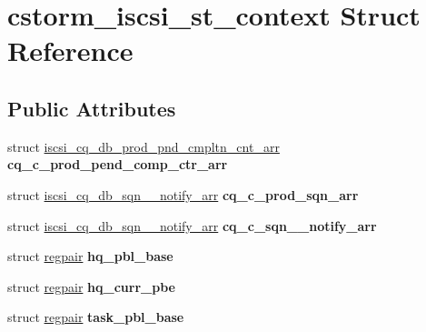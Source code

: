 \hypertarget{structcstorm__iscsi__st__context}{
\section{cstorm\_\-iscsi\_\-st\_\-context Struct Reference}
\label{structcstorm__iscsi__st__context}
}
\subsection*{Public Attributes}
\begin{DoxyCompactItemize}
\item 
\hypertarget{structcstorm__iscsi__st__context_a545823c3e85ab125d74749cd84017614}{
struct \hyperlink{structiscsi__cq__db__prod__pnd__cmpltn__cnt__arr}{iscsi\_\-cq\_\-db\_\-prod\_\-pnd\_\-cmpltn\_\-cnt\_\-arr} {\bfseries cq\_\-c\_\-prod\_\-pend\_\-comp\_\-ctr\_\-arr}}
\label{structcstorm__iscsi__st__context_a545823c3e85ab125d74749cd84017614}

\item 
\hypertarget{structcstorm__iscsi__st__context_ad0f6db90e1d44b06b060afb063b182d9}{
struct \hyperlink{structiscsi__cq__db__sqn__2__notify__arr}{iscsi\_\-cq\_\-db\_\-sqn\_\_\-notify\_\-arr} {\bfseries cq\_\-c\_\-prod\_\-sqn\_\-arr}}
\label{structcstorm__iscsi__st__context_ad0f6db90e1d44b06b060afb063b182d9}

\item 
\hypertarget{structcstorm__iscsi__st__context_a921c65fd3492bb19bdcb732adf4d4180}{
struct \hyperlink{structiscsi__cq__db__sqn__2__notify__arr}{iscsi\_\-cq\_\-db\_\-sqn\_\_\-notify\_\-arr} {\bfseries cq\_\-c\_\-sqn\_\_\-notify\_\-arr}}
\label{structcstorm__iscsi__st__context_a921c65fd3492bb19bdcb732adf4d4180}

\item 
\hypertarget{structcstorm__iscsi__st__context_af375529e4c93023f3deb2d41ed76152e}{
struct \hyperlink{structregpair}{regpair} {\bfseries hq\_\-pbl\_\-base}}
\label{structcstorm__iscsi__st__context_af375529e4c93023f3deb2d41ed76152e}

\item 
\hypertarget{structcstorm__iscsi__st__context_a9d5c537c4f3c9ed9b06cd21b05c45922}{
struct \hyperlink{structregpair}{regpair} {\bfseries hq\_\-curr\_\-pbe}}
\label{structcstorm__iscsi__st__context_a9d5c537c4f3c9ed9b06cd21b05c45922}

\item 
\hypertarget{structcstorm__iscsi__st__context_a1e2f1a20bd41c086a617e1e478f18b9c}{
struct \hyperlink{structregpair}{regpair} {\bfseries task\_\-pbl\_\-base}}
\label{structcstorm__iscsi__st__context_a1e2f1a20bd41c086a617e1e478f18b9c}


\end{DoxyCompactItemize}
